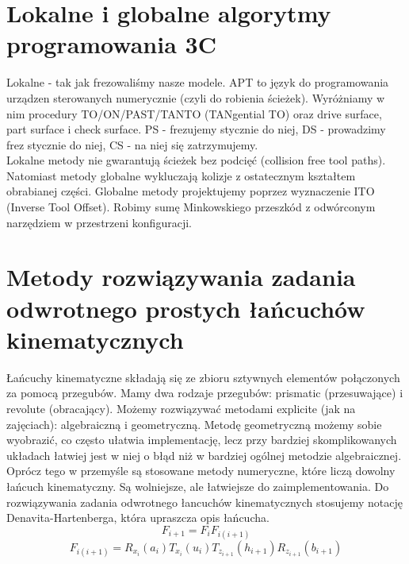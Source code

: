 \documentclass[12pt]{article}
\begin{document}
 \section{Lokalne i globalne algorytmy programowania 3C}
 Lokalne - tak jak frezowaliśmy nasze modele. APT to język do programowania urządzen sterowanych numerycznie (czyli do robienia ścieżek). Wyróżniamy w nim procedury TO/ON/PAST/TANTO (TANgential TO) oraz drive surface, part surface i check surface. PS - frezujemy stycznie do niej, DS - prowadzimy frez stycznie do niej, CS - na niej się zatrzymujemy.\\
Lokalne metody nie gwarantują ścieżek bez podcięć (collision free tool paths). Natomiast metody globalne wykluczają kolizje z ostatecznym kształtem obrabianej części. Globalne metody projektujemy poprzez wyznaczenie ITO (Inverse Tool Offset). Robimy sumę Minkowskiego przeszkód z odwórconym narzędziem w przestrzeni konfiguracji.
 
 \section{Metody rozwiązywania zadania odwrotnego prostych łańcuchów kinematycznych}
 Łańcuchy kinematyczne składają się ze zbioru sztywnych elementów połączonych za pomocą przegubów. Mamy dwa rodzaje przegubów: prismatic (przesuwające) i revolute (obracający). 
 Możemy rozwiązywać metodami explicite (jak na zajęciach): algebraiczną i geometryczną. Metodę geometryczną możemy sobie wyobrazić, co często ułatwia implementację, lecz przy bardziej skomplikowanych układach łatwiej jest w niej o błąd niż w bardziej ogólnej metodzie algebraicznej.
 Oprócz tego w przemyśle są stosowane metody numeryczne, które liczą dowolny łańcuch kinematyczny. Są wolniejsze, ale łatwiejsze do zaimplementowania.
 Do rozwiązywania zadania odwrotnego łancuchów kinematycznych stosujemy notację Denavita-Hartenberga, która upraszcza opis łańcucha.
 $$F_{i+1} = F_{i}F_{i(i+1)}$$
 $$F_{i(i+1)} = R_{x_{i}}(a_{i}) T_{x_{i}}(u_{i}) T_{z_{i+1}}(h_{i+1}) R_{z_{i+1}}(b_{i+1})$$
 
\end{document}
